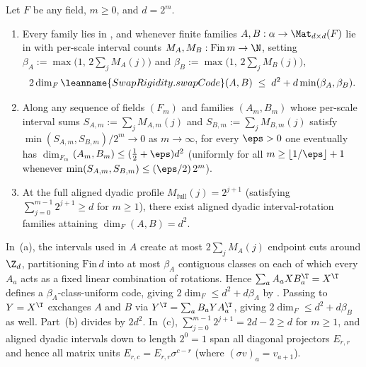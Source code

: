 \begin{proposition}\label{prop:multiscale-interval}
Let $F$ be any field, $m \ge 0$, and $d = 2^m$.
\begin{enumerate}[label=(\alph*)]
\item Every  family lies in ,
  and whenever finite families $A, B : \alpha \to \Mat_{d\times d}(F)$ lie in
   with per-scale interval counts $M_A, M_B : \mathrm{Fin}\,m \to \N$,
  setting $\beta_A := \max\bigl(1,\, 2\sum_j M_A(j)\bigr)$ and
  $\beta_B := \max\bigl(1,\, 2\sum_j M_B(j)\bigr)$,
  \[
    2\dim_F \leanname{SwapRigidity.swapCode}(A, B)
    \;\le\;
    d^2 + d\min(\beta_A, \beta_B).
  \]
\item Along any sequence of fields $(F_m)$ and families $(A_m, B_m)$ whose per-scale interval sums
  $S_{A,m} := \sum_j M_{A,m}(j)$ and $S_{B,m} := \sum_j M_{B,m}(j)$ satisfy
  $\min(S_{A,m}, S_{B,m}) / 2^m \to 0$ as $m \to \infty$, for every $\eps > 0$ one eventually has
  $\dim_{F_m}{}$$(A_m, B_m) \le (\frac{1}{2} + \eps)d^2$ (uniformly
  for all $m \ge \lfloor 1/\eps\rfloor + 1$ whenever $\min(S_{A,m}, S_{B,m}) \le (\eps/2)\,2^m$).
\item At the full aligned dyadic profile $M_{\mathrm{full}}(j) = 2^{j+1}$ (satisfying
  $\sum_{j=0}^{m-1} 2^{j+1} \ge d$ for $m \ge 1$), there exist aligned dyadic interval-rotation
  families attaining $\dim_F {}$$(A, B) = d^2$.
\end{enumerate}
\end{proposition}
\begin{outline}
In~(a), the intervals used in $A$ create at most $2\sum_j M_A(j)$ endpoint cuts around $\Z_d$,
partitioning $\mathrm{Fin}\,d$ into at most $\beta_A$ contiguous classes on each of which every $A_a$
acts as a fixed linear combination of rotations. Hence $\sum_a A_a X B_a^{\T} = X^{\T}$ defines a
$\beta_A$-class-uniform code, giving $2\dim_F \le d^2 + d\beta_A$ by
\cite[Theorem~6.4]{SeventeenthPaper2026}. Passing to $Y = X^{\T}$ exchanges $A$ and $B$ via
$Y^{\T} = \sum_a B_a Y A_a^{\T}$, giving $2\dim_F \le d^2 + d\beta_B$ as well. Part~(b) divides by
$2d^2$. In~(c), $\sum_{j=0}^{m-1} 2^{j+1} = 2d - 2 \ge d$ for $m \ge 1$, and aligned dyadic intervals
down to length $2^0 = 1$ span all diagonal projectors
$E_{r,r}$ and hence all matrix units $E_{r,c} = E_{r,r}\sigma^{c-r}$ (where $(\sigma v)_a = v_{a+1}$).
\end{outline}

